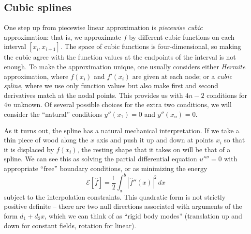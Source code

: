 \documentclass[12pt, leqno]{article} %
\begin{document}
\subsection{Cubic splines}

One step up from piecewise linear approximation is {\em piecewise cubic}
approximation: that is, we approximate $f$ by different cubic
functions on each interval $[x_i, x_{i+1}]$.  The space of cubic
functions is four-dimensional, so making the cubic agree with the
function values at the endpoints of the interval is not enough.
To make the approximation unique, one usually considers either
{\em Hermite} approximation, where $f(x_i)$ and $f'(x_i)$ are given
at each node; or a {\em cubic spline}, where we use only function values
but also make first and second derivatives match at
the nodal points.  This provides us with $4n-2$ conditions for $4n$
unknown.  Of several possible choices for the extra two
conditions, we will consider the ``natural'' conditions
$y''(x_1) = 0$ and $y''(x_n) = 0$.

As it turns out, the spline has a natural mechanical interpretation.
If we take a thin piece of wood along the $x$ axis and push it up and
down at points $x_i$ so that it is displaced by $f(x_i)$, the resting
shape that it takes on will be that of a spline.  We can see this as
solving the partial differential equation $u'''' = 0$ with appropriate
``free'' boundary conditions, or as minimizing the energy
\[
  \mathcal{E}[\hat{f}] = \frac{1}{2} \int_a^b |\hat{f}''(x)|^2 \, dx
\]
subject to the interpolation constraints.  This quadratic
form is not strictly positive definite -- there are two null
directions associated with arguments of the form $d_1 + d_2 x$,
which we can think of as ``rigid body modes''
(translation up and down for constant fields, rotation for linear).
\end{document}
